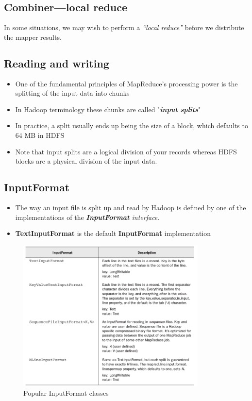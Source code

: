 \documentclass{article}
\begin{document}
\begin{multicols}{2}
\subsection {Combiner—local reduce}
In some situations, we may wish to perform a \emph{“local reduce”} before we distribute the mapper results.

\subsection {Reading and writing}
\begin{itemize}
\item One of the fundamental principles of MapReduce’s processing power is the splitting of the input data into chunks
\item In Hadoop terminology these chunks are called "\textbf{\emph{input splits}}"
\item In practice, a split usually ends up being the size of a block, which defaults to 64 MB in HDFS
\item Note that input splits are a logical division of your records whereas HDFS blocks are a physical division of the input data.
\end{itemize}

\subsection{InputFormat}
\begin{itemize}
\item The way an input file is split up and read by Hadoop is defined by one of the implementations of the \emph{\textbf{InputFormat} interface}. 
\item \textbf{TextInputFormat} is the default \textbf{InputFormat} implementation
\end{itemize}
\begin{figure}[H]
\centering
\includegraphics[width=9.5cm]{assets/popular_input.png}
\caption{Popular InputFormat classes}
\label{fig:awesome_image}
\end{figure}


\end{multicols}
\end{document}
